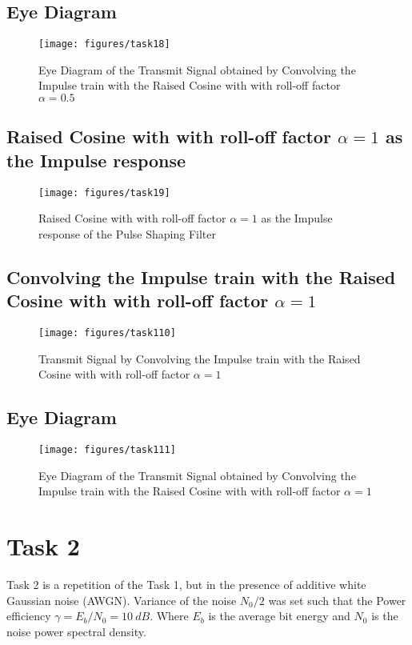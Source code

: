 \documentclass[a4paper,11pt]{article}%
\begin{document}
\subsection{Eye Diagram}

\begin{figure}[H]
	\centering
	\texttt{[image: figures/task18]}
	\caption{Eye Diagram of the Transmit Signal obtained by Convolving the Impulse train with the Raised Cosine with with roll-off factor $\alpha = 0.5$}
\end{figure}



\subsection{Raised Cosine with with roll-off factor $\alpha = 1$ as the Impulse response}

\begin{figure}[H]
	\centering
	\texttt{[image: figures/task19]}
	\caption{Raised Cosine with with roll-off factor $\alpha = 1$ as the Impulse response of the Pulse Shaping Filter}
\end{figure}

\subsection{Convolving the Impulse train with the Raised Cosine with with roll-off factor $\alpha = 1$}

\begin{figure}[H]
	\centering
	\texttt{[image: figures/task110]}
	\caption{Transmit Signal by Convolving the Impulse train with the Raised Cosine with with roll-off factor $\alpha = 1$}
\end{figure}

\subsection{Eye Diagram}

\begin{figure}[H]
	\centering
	\texttt{[image: figures/task111]}
	\caption{Eye Diagram of the Transmit Signal obtained by Convolving the Impulse train with the Raised Cosine with with roll-off factor $\alpha = 1$}
\end{figure}



\section{Task 2}
Task 2 is a repetition of the Task 1, but in the presence of additive white Gaussian noise (AWGN). Variance of the noise $N_0/2$ was set such that the Power efficiency $\gamma = E_b/N_0 = 10 ~dB$. Where $E_b$ is the average bit energy and $N_0$ is the noise power spectral density.
\end{document}
